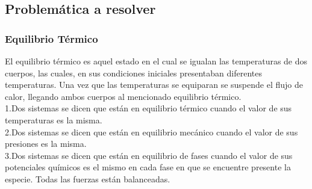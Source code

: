 \documentclass[11pt,a4paper]{article}
\begin{document}
\subsection{Problemática a resolver}
\thispagestyle{empty}
\subsubsection{Equilibrio Térmico}
\thispagestyle{empty}
El equilibrio térmico es aquel estado en el cual se igualan las temperaturas de dos cuerpos, las cuales, en sus condiciones iniciales presentaban diferentes temperaturas. Una vez que las temperaturas se equiparan se suspende el flujo de calor, llegando ambos cuerpos al mencionado equilibrio térmico.
\\1.Dos sistemas se dicen que están en equilibrio térmico cuando el valor de sus temperaturas es la misma.
\\2.Dos sistemas se dicen que están en equilibrio mecánico cuando el valor de sus presiones es la misma.
\\3.Dos sistemas se dicen que están en equilibrio de fases cuando el valor de sus potenciales químicos es el mismo en cada fase en que se encuentre presente la especie.
Todas las fuerzas están balanceadas.
\end{document}
